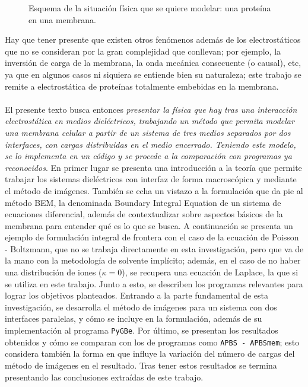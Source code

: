 \documentclass[12pt, twoside, onehalfspace, numbers, spanish]{ezthesis}
\numberwithin{equation}{section}
\begin{document}
\begin{figure}[h]
\centering

\caption{Esquema de la situación física que se quiere modelar: una proteína en una membrana.}\label{Fig:Intro}
\end{figure}
\noindent
Hay que tener presente que existen otros fenómenos además de los electrostáticos que no se consideran por la gran complejidad que conllevan; por ejemplo, la inversión de carga de la membrana, la onda mecánica consecuente (o causal), etc, ya que en algunos casos ni siquiera se entiende bien su naturaleza; este trabajo se remite a electrostática de proteínas totalmente embebidas en la membrana.\\\\
El presente texto busca entonces \textit{presentar la física que hay tras una interacción electrostática en medios dieléctricos, trabajando un método que permita modelar una membrana celular a partir de un sistema de tres medios separados por dos interfaces, con cargas distribuidas en el medio encerrado. Teniendo este modelo, se lo implementa en un código y se procede a la comparación con programas ya reconocidos}.
En primer lugar se presenta una introducción a la teoría que permite trabajar los sistemas dieléctricos con interfaz de forma macroscópica y mediante el método de imágenes. También se echa un vistazo a la formulación que da pie al método BEM, la denominada Boundary Integral Equation de un sistema de ecuaciones diferencial, además de contextualizar sobre aspectos básicos de la membrana para entender qué es lo que se busca. A continuación se presenta un ejemplo de formulación integral de frontera con el caso de la ecuación de Poisson - Boltzmann, que no se trabaja directamente en esta investigación, pero que va de la mano con la metodología de solvente implícito; además, en el caso de no haber una distribución de iones ($\kappa = 0$), se recupera una ecuación de Laplace, la que si se utiliza en este trabajo. Junto a esto, se describen los programas relevantes para lograr los objetivos planteados. Entrando a la parte fundamental de esta investigación, se desarrolla el método de imágenes para un sistema con dos interfaces paralelas, y cómo se incluye en la formulación, además de su implementación al programa \texttt{PyGBe}. Por último, se presentan los resultados obtenidos y cómo se comparan con los de programas como \texttt{APBS - APBSmem}; esto considera también la forma en que influye la variación del número de cargas del método de imágenes en el resultado. Tras tener estos resultados se termina presentando las conclusiones extraídas de este trabajo.
\end{document}
